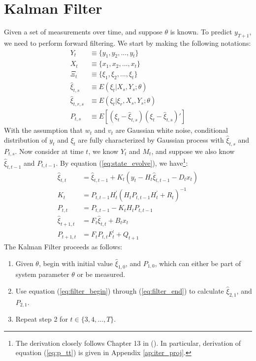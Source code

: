 \documentclass[12pt]{article}
\newenvironment{boenumerate}
    {\begin{enumerate}\renewcommand\labelenumi{\textbf\theenumi}}
    {\end{enumerate}}
\numberwithin{equation}{section}
\begin{document}
\section{Kalman Filter} \label{sec:filter}
Given a set of measurements over time, and suppose $\theta$ is known. To predict $y_{T+1}$, we need to perform forward filtering. We start by making the following notations:
\begin{align*}
    Y_t &\equiv \{y_1, y_2, ..., y_t\} \\
    X_t &\equiv \{x_1, x_2, ..., x_t\} \\
    \Xi_t &\equiv \{\xi_1,\xi_2,...,\xi_t\} \\
    \hat{\xi}_{t,s} &\equiv E(\xi_t|X_{s},Y_{s};\theta) \\
    \hat{\xi}_{t,r,s} &\equiv E(\xi_t|\xi_r,X_{s},Y_{s};\theta) \\
    P_{t,s} &\equiv E[(\xi_t-\hat{\xi}_{t,s})(\xi_t-\hat{\xi}_{t,s})']
\end{align*}
With the assumption that $w_t$ and $v_t$ are Gaussian white noise, conditional distribution of $y_t$ and $\xi_t$ are fully characterized by Gaussian process with $\hat{\xi}_{t,s}$ and $P_{t,s}$. Now consider at time $t$, we know $Y_t$ and $M_t$, and suppose we also know $\hat{\xi}_{t,t-1}$ and $P_{t,t-1}$. By equation (\ref{eq:state_evolve}), we have\footnote{The derivation closely follows Chapter 13 in (\cite{hamilton_1994}). In particular, derivation of equation (\ref{eq:p_tt}) is given in Appendix \ref{ap:iter_proj}.}:
\begin{align}
    \hat{\xi}_{t,t} &= \hat{\xi}_{t,t-1} + K_t(y_t-H_t\hat{\xi}_{t,t-1}-D_tx_t) \label{eq:filter_begin} \\
    K_t &= P_{t,t-1}H_t^{'}(H_tP_{t,t-1}H_t^{'}+R_t)^{-1} \label{eq:gain} \\
    P_{t,t} &= P_{t,t-1} - K_tH_tP_{t,t-1} \label{eq:p_tt} \\
    \hat{\xi}_{t+1,t} &= F_t\hat{\xi}_{t,t} + B_tx_t \\
    P_{t+1,t} &= F_tP_{t,t}F_t^{'}+Q_{t+1} \label{eq:filter_end}
\end{align}
The Kalman Filter proceeds as follows:
\begin{boenumerate}
    \item Given $\theta$, begin with initial value $\hat{\xi}_{1,0}$, and $P_{1,0}$, which can either be part of system parameter $\theta$ or be measured. 
    \item Use equation (\ref{eq:filter_begin}) through (\ref{eq:filter_end}) to calculate $\hat{\xi}_{2,1}$, and $P_{2,1}$.
    \item Repeat step 2 for $t\in\{3, 4, ..., T\}$.
\end{boenumerate}
\end{document}
